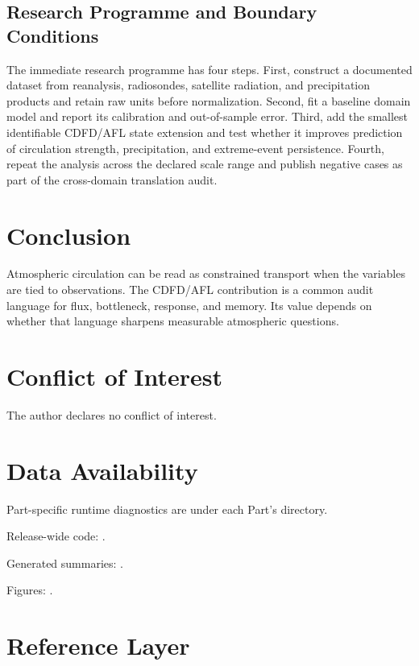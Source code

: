 \documentclass[12pt,a4paper]{article}
\begin{document}
\subsection{Research Programme and Boundary Conditions}

The immediate research programme has four steps. First, construct a documented
dataset from reanalysis, radiosondes, satellite radiation, and precipitation products and retain raw units before normalization.
Second, fit a baseline domain model and report its calibration and out-of-sample
error. Third, add the smallest identifiable CDFD/AFL state extension and test
whether it improves prediction of circulation strength, precipitation, and extreme-event persistence. Fourth, repeat the
analysis across the declared scale range and publish negative cases as part of
the cross-domain translation audit.


\section{Conclusion}

Atmospheric circulation can be read as constrained transport when the variables
are tied to observations. The CDFD/AFL contribution is a common audit language
for flux, bottleneck, response, and memory. Its value depends on whether that
language sharpens measurable atmospheric questions.

\section*{Conflict of Interest}
The author declares no conflict of interest.

\section*{Data Availability}
Part-specific runtime diagnostics are under each Part's  directory.

Release-wide code: .

Generated summaries: .

Figures: .


\section{Reference Layer}



\end{document}
